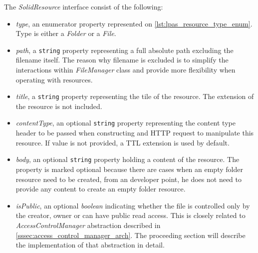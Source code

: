 The \textit{SolidResource} interface consist of the following:
\begin{itemize}
    \item \textit{type}, an enumerator property represented on \autoref{lst:lpas_resource_type_enum}. Type is either a \textit{Folder} or a \textit{File}.
    \item \textit{path}, a \texttt{string} property representing a full absolute path excluding the filename itself. The reason why filename is excluded is to simplify the interactions within \textit{FileManager} class and provide more flexibility when operating with resources.
    \item \textit{title}, a \texttt{string} property representing the tile of the resource. The extension of the resource is not included.
    \item \textit{contentType}, an optional \texttt{string} property representing the content type header to be passed when constructing and HTTP request to  manipulate this resource. If value is not provided, a TTL extension is used by default.
    \item \textit{body}, an optional \texttt{string} property holding a content of the resource. The property is marked optional because there are cases when an empty folder resource need to be created, from an \lpa{} developer point, he does not need to provide any content to create an empty folder resource.
    \item \textit{isPublic}, an optional \textit{boolean} indicating whether the file is controlled only by the creator, owner or can have public read access. This is closely related to \textit{AccessControlManager} abstraction described in \autoref{sssec:access_control_manager_arch}. The proceeding section will describe the implementation of that abstraction in detail.  
\end{itemize}

